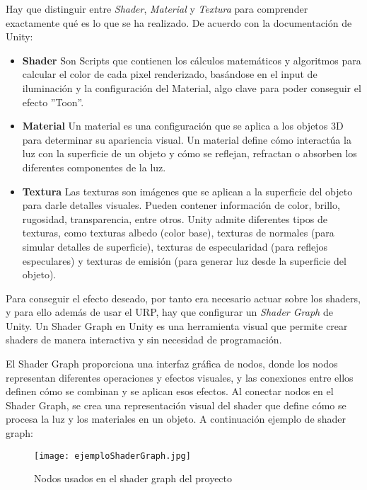 Hay que distinguir entre \textit{Shader}, \textit{Material} y \textit{Textura} para comprender exactamente qué es lo que se ha realizado. De acuerdo con la documentación de Unity:

\begin{itemize}    
    \item \textbf{Shader} Son Scripts que contienen los cálculos matemáticos y algoritmos para calcular el color de cada pixel renderizado, basándose en el input de iluminación y la configuración del Material, algo clave para poder conseguir el efecto ''Toon''.
   
    \item \textbf{Material} Un material es una configuración que se aplica a los objetos 3D para determinar su apariencia visual. Un material define cómo interactúa la luz con la superficie de un objeto y cómo se reflejan, refractan o absorben los diferentes componentes de la luz.

    \item \textbf{Textura}  Las texturas son imágenes que se aplican a la superficie del objeto para darle detalles visuales. Pueden contener información de color, brillo, rugosidad, transparencia, entre otros. Unity admite diferentes tipos de texturas, como texturas albedo (color base), texturas de normales (para simular detalles de superficie), texturas de especularidad (para reflejos especulares) y texturas de emisión (para generar luz desde la superficie del objeto).
\end{itemize}

Para conseguir el efecto deseado, por tanto era necesario actuar sobre los shaders, y para ello además de usar el URP, hay que configurar un \textit{Shader Graph} \cite{ShaderGraph} de Unity. Un Shader Graph en Unity es una herramienta visual que permite crear shaders de manera interactiva y sin necesidad de programación.

El Shader Graph proporciona una interfaz gráfica de nodos, donde los nodos representan diferentes operaciones y efectos visuales, y las conexiones entre ellos definen cómo se combinan y se aplican esos efectos. Al conectar nodos en el Shader Graph, se crea una representación visual del shader que define cómo se procesa la luz y los materiales en un objeto. A continuación ejemplo de shader graph:

\begin{figure}[H]
    \centering
    \texttt{[image: ejemploShaderGraph.jpg]}
    \caption{Nodos usados en el shader graph del proyecto}
\end{figure}

